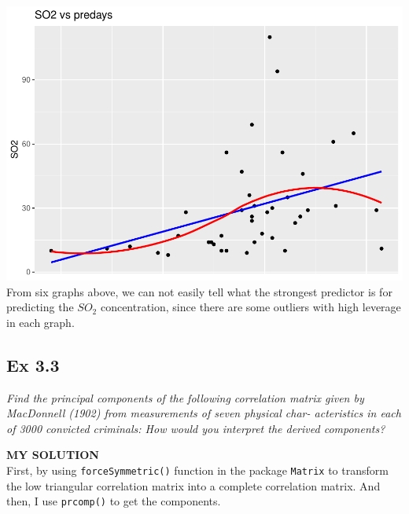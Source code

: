 \documentclass[
]{article}
\begin{document}
\includegraphics[width=0.5\linewidth,height=0.33\textheight]{HUDM6122-Homework_03-Chenguang-Pan_files/figure-latex/unnamed-chunk-3-6}
From six graphs above, we can not easily tell what the strongest
predictor is for predicting the \(SO_2\) concentration, since there are
some outliers with high leverage in each graph.

\hypertarget{ex-3.3}{%
\subsection{Ex 3.3}\label{ex-3.3}}

\emph{Find the principal components of the following correlation matrix
given by MacDonnell (1902) from measurements of seven physical char-
acteristics in each of 3000 convicted criminals: How would you interpret
the derived components?}

\textbf{MY SOLUTION}\\
First, by using \texttt{forceSymmetric()} function in the package
\texttt{Matrix} to transform the low triangular correlation matrix into
a complete correlation matrix. And then, I use \texttt{prcomp()} to get
the components.
\end{document}
